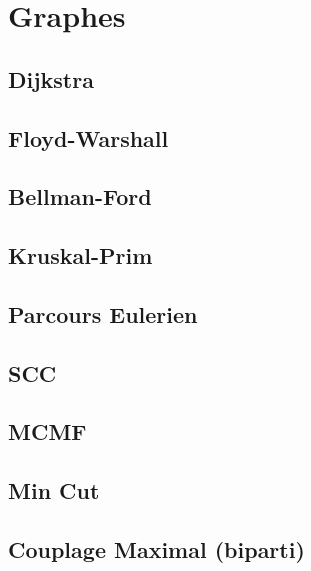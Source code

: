 \documentclass[10pt]{extarticle}
\begin{document}
\tableofcontents


\section{Graphes}
\subsection{Dijkstra}
{\scriptsize}

\subsection{Floyd-Warshall}
{\scriptsize}

\subsection{Bellman-Ford}
{\scriptsize}

\subsection{Kruskal-Prim}
{\scriptsize}

\subsection{Parcours Eulerien}
{\scriptsize}

\subsection{SCC}
{\scriptsize}

\subsection{MCMF}
{\scriptsize}

\subsection{Min Cut}
{\scriptsize}

\subsection{Couplage Maximal (biparti)}
{\scriptsize}
\end{document}
